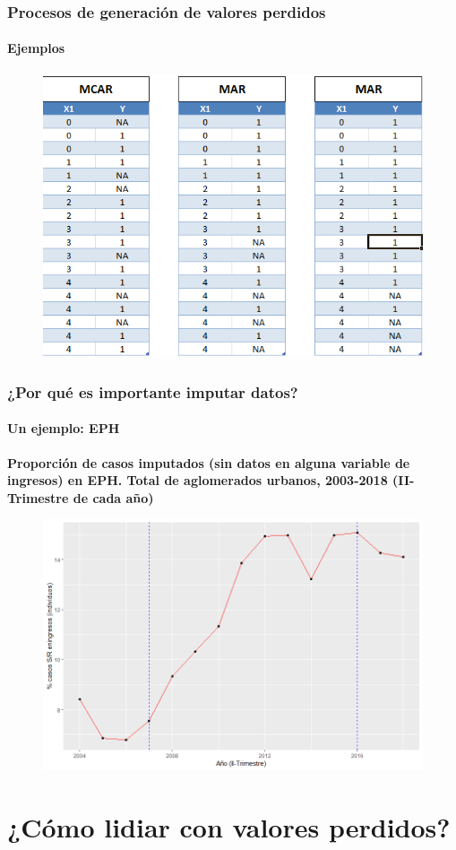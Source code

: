 \documentclass{beamer}
\begin{document}
\begin{frame}
	\frametitle{Procesos de generación de valores perdidos}
	\framesubtitle{Ejemplos}
	\begin{figure}
		\centering
		\includegraphics[width=0.55\linewidth, height=0.66\textheight]{../img/2_patterns}
\end{figure}
\end{frame}

\begin{frame}
	\frametitle{¿Por qué es importante imputar datos?}
	\framesubtitle{Un ejemplo: EPH}
	\small{\textbf{Proporción de casos imputados (sin datos en alguna variable de ingresos) en EPH. Total de aglomerados urbanos, 2003-2018 (II-Trimestre de cada año)}}
	\begin{figure}
		\centering
		\includegraphics[width=0.7\linewidth, height=0.55\textheight]{../img/4_eph_NR2}
	\end{figure}
\end{frame}

\section{¿Cómo lidiar con valores perdidos?}
\end{document}
